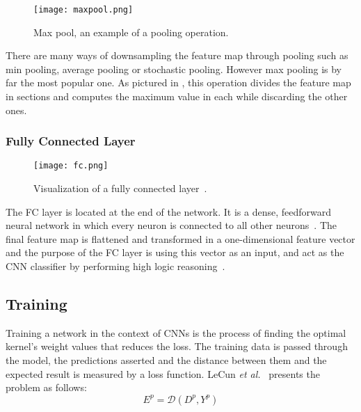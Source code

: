 \documentclass[class=report, crop=false, a4paper, 12pt]{standalone}
\begin{document}
\begin{figure}[!h]
    \centering
    \texttt{[image: maxpool.png]} %
    \caption{Max pool, an example of a pooling operation.}
    \label{fig:maxpool}
\end{figure}

There are many ways of downsampling the feature map through pooling such as min pooling, average pooling or stochastic pooling. However max pooling is by far the most popular one. As pictured in , this operation divides the feature map in sections and computes the maximum value in each while discarding the other ones.

\subsubsection{Fully Connected Layer}

\begin{figure}[H]
    \centering
    \texttt{[image: fc.png]}
    \caption{Visualization of a fully connected layer~\autocite{kostApplyingNeuralNetworks2019}.}
    \label{fig:maxpool}
\end{figure}

The \gls{FC} layer is located at the end of the network. It is a dense, feedforward neural network in which every neuron is connected to all other neurons~\autocite{yamashitaConvolutionalNeuralNetworks2018, alzubaidiReviewDeepLearning2021}. The final feature map is flattened and transformed in a one-dimensional feature vector and the purpose of the FC layer is using this vector as an input, and act as the CNN classifier by performing high logic reasoning~\autocite{guRecentAdvancesConvolutional2018}.

\subsection{Training}
Training a network in the context of CNNs is the process of finding the optimal kernel's weight values that reduces the loss. The training data is passed through the model, the predictions asserted and the distance between them and the expected result is measured by a loss function. LeCun \textit{et al.}~\autocite{lecunGradientBasedLearningApplied1998} presents the problem as follows:
\begin{equation}
    E^p = \mathcal{D}(D^p, Y^p)
\end{equation}
\end{document}
